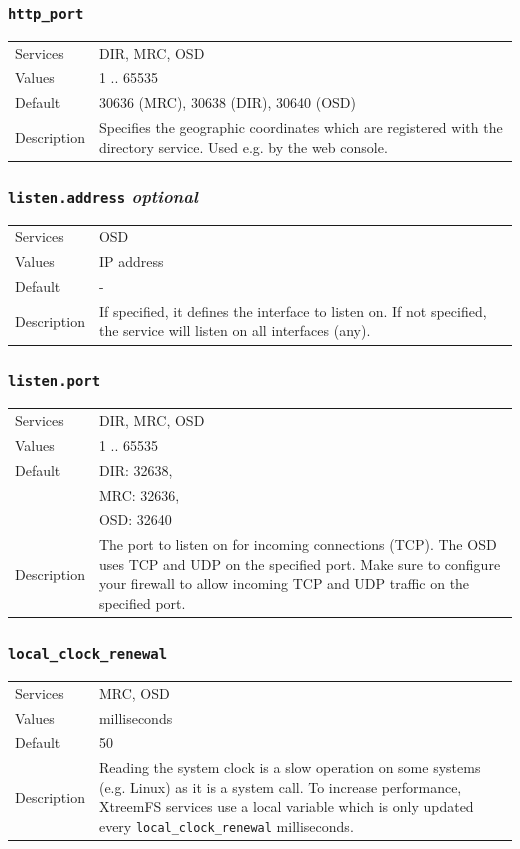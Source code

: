\documentclass[a4paper,10pt]{book}
\begin{document}
\subsubsection{\texttt{http\_port}}
\begin{tabular}{lp{10cm}}
 Services & DIR, MRC, OSD\\
 Values   & 1 .. 65535 \\
 Default  & 30636 (MRC), 30638 (DIR), 30640 (OSD)\\
 Description & Specifies the geographic coordinates which are registered with the directory service. Used e.g. by the web console.
\end{tabular}

\subsubsection{\texttt{listen.address} \textit{optional}}
\begin{tabular}{lp{10cm}}
 Services & OSD\\
 Values   & IP address \\
 Default  & -\\
 Description & If specified, it defines the interface to listen on. If not specified, the service will listen on all interfaces (any).
\end{tabular}

\subsubsection{\texttt{listen.port}}
\begin{tabular}{lp{10cm}}
 Services & DIR, MRC, OSD\\
 Values   & 1 .. 65535 \\
 Default  & DIR: 32638,\\
 & MRC: 32636,\\
 & OSD: 32640 \\
 Description & The port to listen on for incoming connections (TCP). The OSD uses TCP and UDP on the specified port. Make sure to configure your firewall to allow incoming TCP and UDP traffic on the specified port.
\end{tabular}

\subsubsection{\texttt{local\_clock\_renewal}}
\begin{tabular}{lp{10cm}}
 Services & MRC, OSD\\
 Values   & milliseconds \\
 Default  & 50\\
 Description & Reading the system clock is a slow operation on some systems (e.g. Linux) as it is a system call. To increase performance, XtreemFS services use a local variable which is only updated every \texttt{local\_clock\_renewal} milliseconds.
\end{tabular}
\end{document}
